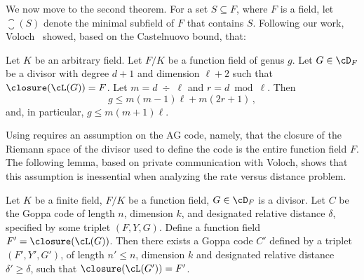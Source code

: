 We now move to the second theorem. For a set $S \subseteq F$, where
$F$ is a field, let $\closure(S)$ denote the minimal subfield of $F$
that contains $S$. Following our work, Voloch~\cite{V:09} showed,
based on the Castelnuovo bound, that:
\begin{theorem}
\label{thm:castel} Let $K$ be an arbitrary field. Let $F/K$ be a
function field of genus $g$. Let $G \in\cD_F$ be a divisor with
degree $d+1$ and dimension $\ell+2$ such that
$\closure(\cL(G))=F$. Let $m = d \;\div\; \ell$ and $r = d \bmod
\ell$. Then $$g \le m(m-1)\ell + m(2r+1)\,,$$ and, in particular, $g
\le m(m+1)\ell$.
\end{theorem}

Using  requires an assumption on the AG
code, namely, that the closure of the Riemann space of the divisor
used to define the code is the entire function field $F$. The
following lemma, based on private communication with Voloch, shows
that this assumption is inessential when analyzing the rate versus
distance problem.
\begin{lemma}
\label{lem:closure-assumption} Let $K$ be a finite field, $F/K$ be a
function field, $G \in\cD_F$ is a divisor. Let $C$ be the Goppa code
of length $n$, dimension $k$, and designated relative distance
$\delta$, specified by some triplet $(F,Y,G)$. Define a function
field $F' = \closure(\cL(G))$. Then there exists a Goppa code $C'$
defined by a triplet $(F',Y',G')$, of length $n' \le n$, dimension
$k$ and designated relative distance $\delta' \ge \delta$, such that
$\closure(\cL(G'))=F'$.
\end{lemma}
